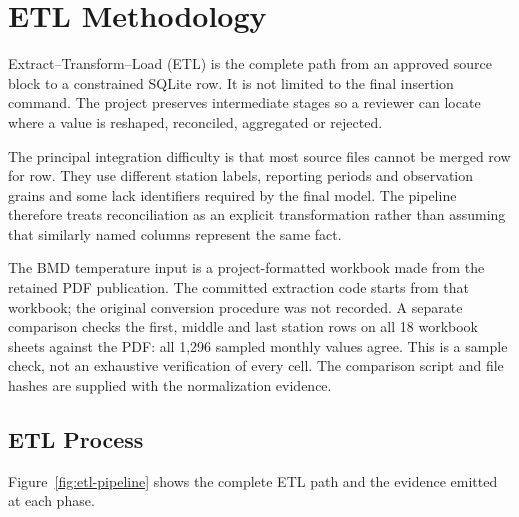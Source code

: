 \section{ETL Methodology}
\label{sec:etl}

Extract--Transform--Load (ETL) is the complete path from an approved source
block to a constrained SQLite row. It is not limited to the final insertion
command. The project preserves intermediate stages so a reviewer can locate
where a value is reshaped, reconciled, aggregated or rejected.

The principal integration difficulty is that most source files cannot be
merged row for row. They use different station labels, reporting periods and
observation grains and some lack identifiers required by the final model. The
pipeline therefore treats reconciliation as an explicit transformation rather
than assuming that similarly named columns represent the same fact.

The BMD temperature input is a project-formatted workbook made from the
retained PDF publication. The committed extraction code starts from that
workbook; the original conversion procedure was not recorded. A separate
comparison checks the first, middle and last station rows on all 18 workbook
sheets against the PDF: all 1,296 sampled monthly values agree. This is a
sample check, not an exhaustive verification of every cell. The comparison
script and file hashes are supplied with the normalization evidence.

\subsection{ETL Process}
\label{subsec:etl-process}

Figure~\ref{fig:etl-pipeline} shows the complete ETL path and the evidence
emitted at each phase.

